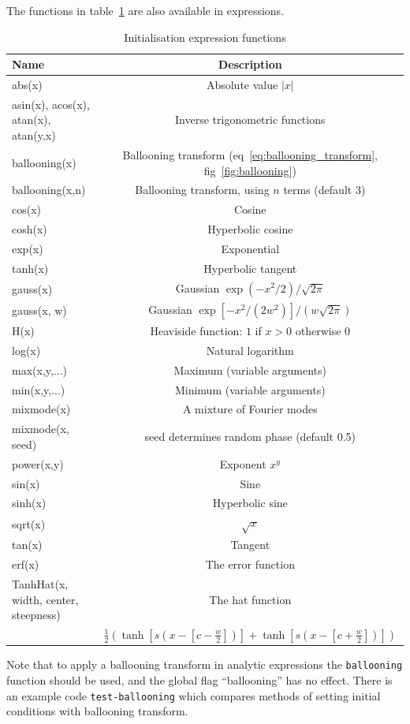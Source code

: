 \documentclass[12pt]{article}
\def\L{\left}
\def\R{\right}
\begin{document}
The functions in table~\ref{tab:initexprfunc} are also available in
expressions.
%
\begin{table}[htb!]
\centering
\caption{Initialisation expression functions}
%
\label{tab:initexprfunc}
%
\begin{tabular}{l | c }
\hline
Name & Description \\
\hline
abs(x) & Absolute value $\L|x\R|$\\
asin(x), acos(x), atan(x), atan(y,x) & Inverse trigonometric functions \\
ballooning(x) & Ballooning transform (eq~\ref{eq:ballooning_transform},
fig~\ref{fig:ballooning}) \\
ballooning(x,n) & Ballooning transform, using $n$ terms (default 3) \\
cos(x) & Cosine\\
cosh(x) & Hyperbolic cosine\\
exp(x) & Exponential \\
tanh(x) & Hyperbolic tangent \\
gauss(x) & Gaussian $\exp\L(-x^2/2\R) / \sqrt{2\pi}$\\
gauss(x, w) & Gaussian $\exp\L[-x^2/\L(2w^2\R)\R] /
\L(w\sqrt{2\pi}\R)$\\
H(x) & Heaviside function: $1$ if $x > 0$ otherwise $0$\\
log(x) & Natural logarithm \\
max(x,y,...) & Maximum (variable arguments) \\
min(x,y,...) & Minimum (variable arguments) \\
mixmode(x) & A mixture of Fourier modes \\
mixmode(x, seed) & seed determines random phase (default 0.5) \\
power(x,y) & Exponent $x^y$ \\
sin(x) & Sine\\
sinh(x) & Hyperbolic sine\\
sqrt(x) & $\sqrt{x}$\\
tan(x) & Tangent \\
erf(x) & The error function \\
TanhHat(x, width, center, steepness) & The hat function\\
        &$\frac{1}{2}\L(\tanh\L[s \L(x-\L[c-\frac{w}{2}\R]\R)\R]
          + \tanh\L[s \L(x-\L[c+\frac{w}{2}\R]\R)\R] \R)$ \\
\hline
\end{tabular}
%
\end{table}
%
Note that to apply a ballooning transform in analytic expressions the
\texttt{ballooning} function should be used, and the global flag ``ballooning''
has no effect. There is an example code \texttt{test-ballooning} which compares
methods of setting initial conditions with ballooning transform.
\end{document}
